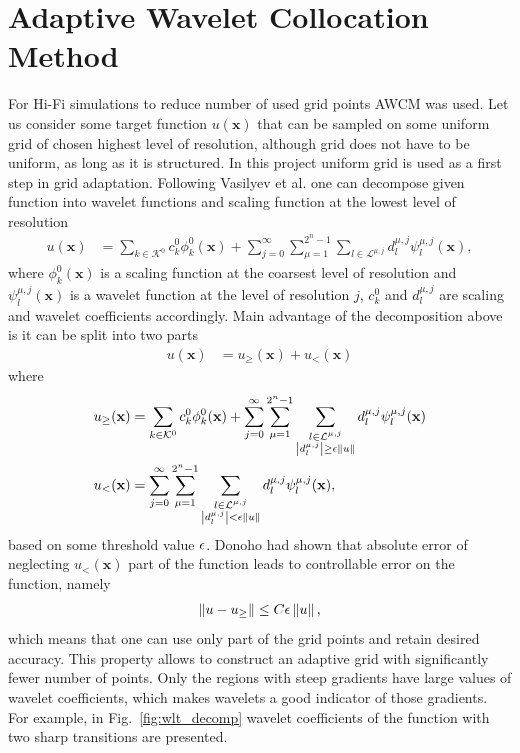 \section{Adaptive Wavelet Collocation Method}
For Hi-Fi simulations to reduce number of used grid points AWCM was used. Let us consider some target function $u(\mathbf x)$ that can be sampled on some uniform grid of chosen highest level of resolution, although grid does not have to be uniform, as long as it is structured. In this project uniform grid is used as a first step in grid adaptation. Following Vasilyev et al. \cite{lib:wlt_main} one can decompose given function into wavelet functions and scaling function at the lowest level of resolution
\begin{align}
u(\mathbf x) &= \sum_{k \in \mathcal K^0} c_k^0 \phi_k^0 (\mathbf x) + \sum_{j = 0}^\infty \sum_{\mu = 1}^{2^n - 1} \sum_{l \in \mathcal L^{\mu, j}} d_l^{\mu, j} \psi_l^{\mu, j} (\mathbf x),
\end{align}
where $\phi_k^0(\mathbf x)$ is a scaling function at the coarsest level of resolution and $\psi_l^{\mu, j}(\mathbf x)$ is a wavelet function at the level of resolution $j$, $c_k^0$ and $d_l^{\mu, j}$ are scaling and wavelet coefficients accordingly. Main advantage of the decomposition above is it can be split into two parts
\begin{align}
u(\mathbf x) &= u_\ge (\mathbf x) + u_< (\mathbf x)
\end{align}
where
\begin{align}
\nonumber
u_\ge (\mathbf x) &= \sum_{k \in \mathcal K^0} c_k^0 \phi_k^0 (\mathbf x) + \sum_{j = 0}^\infty \sum_{\mu = 1}^{2^n - 1} \sum_{\substack{l \in \mathcal L^{\mu, j} \\ \left|d_l^{\mu, j}\right| \ge \epsilon \left\|u\right\| }} d_l^{\mu, j} \psi_l^{\mu, j} (\mathbf x) \\
u_<(\mathbf x) &= \sum_{j = 0}^\infty \sum_{\mu = 1}^{2^n - 1} \sum_{\substack{l \in \mathcal L^{\mu, j} \\ \left|d_l^{\mu, j}\right| < \epsilon \left\|u\right\| }} d_l^{\mu, j} \psi_l^{\mu, j} (\mathbf x),
\end{align}
based on some threshold value $\epsilon$. Donoho \cite{lib:donoho} had shown that absolute error of neglecting $u_<(\mathbf x)$ part of the function leads to controllable error on the function, namely
\begin{align}
\left\|u - u_\ge\right\| \le C \epsilon \left\|u\right\|,
\end{align}
which means that one can use only part of the grid points and retain desired accuracy. This property allows to construct an adaptive grid with significantly fewer number of points. Only the regions with steep gradients have large values of wavelet coefficients, which makes wavelets a good indicator of those gradients. For example, in Fig.~\ref{fig:wlt_decomp} wavelet coefficients of the function with two sharp transitions are presented.

